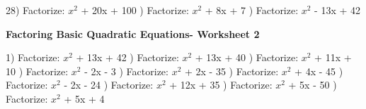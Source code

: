 \documentclass{article}%
\begin{document}
28) Factorize: $x^2$ + 20x + 100%
\newline%
\newline%
) Factorize: $x^2$ + 8x + 7%
\newline%
\newline%
) Factorize: $x^2$ - 13x + 42%
\newline%
\newline%
\newline%
\pagebreak%
\large%
\begin{center}%
\textbf{Factoring Basic Quadratic Equations- Worksheet 2}%
\newline%
\newline%
\newline%
\end{center} \normalsize%
1) Factorize: $x^2$ + 13x + 42%
\newline%
\newline%
) Factorize: $x^2$ + 13x + 40%
\newline%
\newline%
) Factorize: $x^2$ + 11x + 10%
\newline%
\newline%
) Factorize: $x^2$ - 2x - 3%
\newline%
\newline%
) Factorize: $x^2$ + 2x - 35%
\newline%
\newline%
) Factorize: $x^2$ + 4x - 45%
\newline%
\newline%
) Factorize: $x^2$ - 2x - 24%
\newline%
\newline%
) Factorize: $x^2$ + 12x + 35%
\newline%
\newline%
) Factorize: $x^2$ + 5x - 50%
\newline%
\newline%
) Factorize: $x^2$ + 5x + 4%
\newline%
\end{document}

